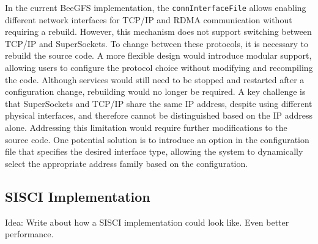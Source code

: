In the current BeeGFS implementation, the \texttt{connInterfaceFile} allows enabling different network interfaces for TCP/IP and RDMA communication without requiring a rebuild. However, this mechanism does not support switching between TCP/IP and SuperSockets. To change between these protocols, it is necessary to rebuild the source code. A more flexible design would introduce modular support, allowing users to configure the protocol choice without modifying and recompiling the code. Although services would still need to be stopped and restarted after a configuration change, rebuilding would no longer be required. A key challenge is that SuperSockets and TCP/IP share the same IP address, despite using different physical interfaces, and therefore cannot be distinguished based on the IP address alone. Addressing this limitation would require further modifications to the source code. One potential solution is to introduce an option in the configuration file that specifies the desired interface type, allowing the system to dynamically select the appropriate address family based on the configuration.

\subsection{SISCI Implementation}
Idea: Write about how a SISCI implementation could look like. Even better performance.